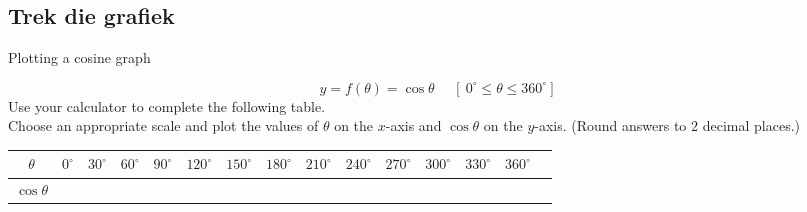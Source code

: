 \subsection*{Trek die grafiek}
\begin{wex}
{Plotting a cosine graph}
{
\begin{equation*}
  y=f(\theta)=\cos  \theta~~~~~~[~0^{\circ} \leq \theta \leq 360^{\circ}]
\end{equation*}
Use your calculator to complete the following table. \\
Choose an appropriate scale and plot the values of
$\theta$ on the $x$-axis and $\cos\theta$ on the $y$-axis. (Round
answers to $2$ decimal places.)

\begin{table}[H]
\begin{center}
\begin{tabular}{|c|m{0.3cm}|m{0.3cm}|m{0.3cm}|m{0.5cm}|m{0.5cm}|m{0.5cm}|m{0.5cm}|m{0.5cm}|m{0.5cm}|m{0.5cm}|m{0.5cm}|m{0.5cm}|m{0.5cm}|} \hline

\footnotesize$\theta $&
\footnotesize$0^{\circ }$&
\footnotesize$30^{\circ }$&
\footnotesize$60^{\circ }$&
\footnotesize$90^{\circ }$&
\footnotesize$120^{\circ }$&
\footnotesize$150^{\circ }$&
\footnotesize$180^{\circ }$&
\footnotesize$210^{\circ }$&
\footnotesize$240^{\circ }$&
\footnotesize$270^{\circ }$&
\footnotesize$300^{\circ }$&
\footnotesize$330^{\circ }$&
\footnotesize$360^{\circ }$
\\ \hline

\footnotesize$\cos\theta $&
&
&
&
&
&
&
&
&
&
&
&
&
&

 \hline
\end{tabular}
\end{center}
\end{table}
}
{
\begin{table}[H]

\begin{center}


\end{center}
\end{table}}
\end{wex}
